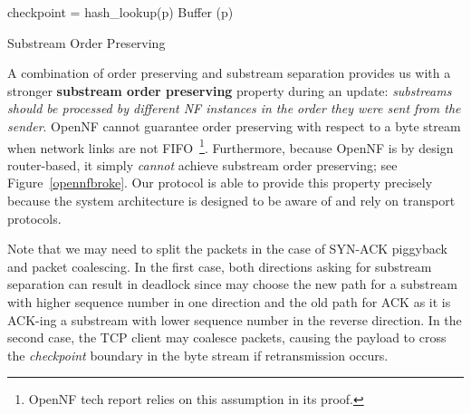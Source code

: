 \begin{algorithm} [htbp]
\footnotesize
\SetAlgoLined
{}

 {
checkpoint = hash\_lookup(p)\;
 {
Buffer (p)\;
} 
} 





\caption{Substream Order Preserving} \label{strictorderpres}
\end{algorithm} 




A combination of order preserving and substream separation provides us with a stronger \textbf{substream order preserving} property during an update: \textit{substreams should be processed by different NF instances in the order they were sent from the sender}. OpenNF cannot guarantee order preserving with respect to a byte stream when network links are not FIFO~\footnote{OpenNF tech report relies on this assumption in its proof.}. Furthermore, because OpenNF is by design router-based, it simply \textit{cannot} achieve substream order preserving; see Figure~\ref{opennfbroke}. Our protocol is able to provide this property precisely because the system architecture is designed to be aware of and rely on transport protocols.


Note that we may need to split the packets in the case of SYN-ACK piggyback and packet coalescing. In the first case, both directions asking for substream separation can result in deadlock since \system may choose the new path for a substream with higher sequence number in one direction and the old path for ACK as it is ACK-ing a substream with lower sequence number in the reverse direction. In the second case, the TCP client may coalesce packets, causing the payload  to cross the \textit{checkpoint} boundary in the byte stream if retransmission occurs. 







